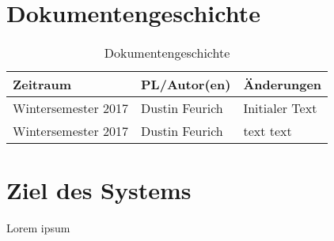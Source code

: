 
\section{Dokumentengeschichte}
\begin{table}[h]
 \begin{tabular}{|l|l|p{4cm}|}
 \hline
 Zeitraum & PL/Autor(en) & Änderungen \\
 \hline
 Wintersemester 2017 & Dustin Feurich &
 Initialer Text

  \\
 \hline
 Wintersemester 2017 & Dustin Feurich &
text \newline
text \newline

  \\
 \hline


 \end{tabular}
 \caption{Dokumentengeschichte}
 \end{table}

\section{Ziel des Systems}
Lorem ipsum


